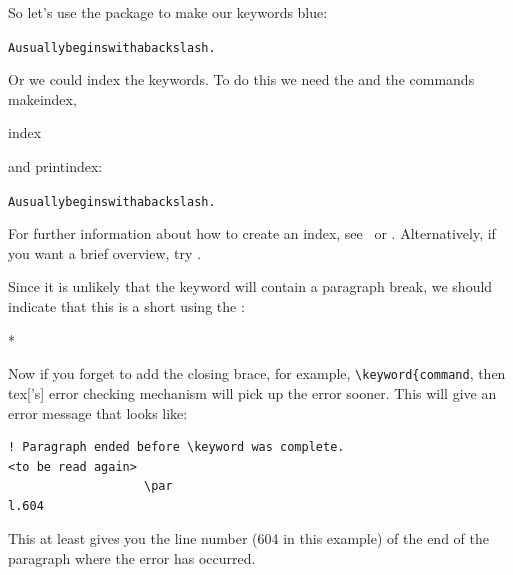 So let's use the  package to make our keywords
blue:\screenpagebreak
\begin{code}
\begin{alltt}




A  usually begins with a backslash.

\end{alltt}
\end{code}
Or we could index the keywords.  To do this we need the
  and the commands 
\gls{makeindex}, 
\begin{inlinedef}\gls{index}\end{inlinedef}
and \gls{printindex}:
\begin{code}
\begin{alltt}





A  usually begins with a backslash.


\end{alltt}
\end{code}
For further information about how to create an index, 
see \latexguide\ or \latexcomp.
Alternatively, if you want a brief overview, try \latexthesis.

Since it is unlikely that the keyword will contain a paragraph break,
we should indicate that this is a 
\gls{short} using the :
\begin{codeS}
*
\end{codeS}
Now if you forget to add the closing brace, for example,
\verb|\keyword{command|, then \gls{tex}['s] error checking mechanism will 
pick up the error sooner. This will give an error message that
looks like:
\begin{verbatim}
! Paragraph ended before \keyword was complete.
<to be read again>
                   \par
l.604
\end{verbatim}
This at least gives you the line number (604 in this example) of the
end of the paragraph where the error has occurred.

